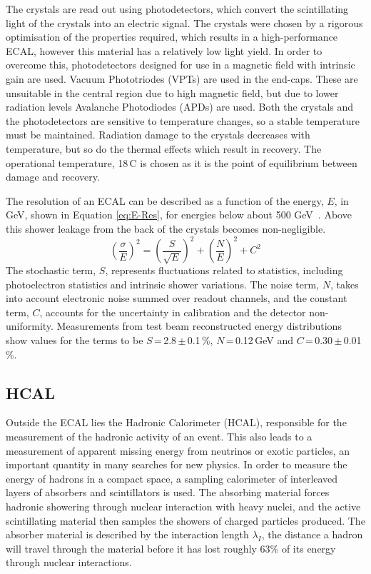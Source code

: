 The crystals are read out using photodetectors, which convert the scintillating light of the crystals into an electric signal. The crystals were chosen by a rigorous optimisation of the properties required, which results in a high-performance ECAL, however this material has a relatively low light yield. In order to overcome this, photodetectors designed for use in a magnetic field with intrinsic gain are used. Vacuum Phototriodes  (VPTs) are used in the end-caps. These are unsuitable in the central region due to high magnetic field, but due to lower radiation levels Avalanche Photodiodes (APDs) are used. Both the crystals and the photodetectors are sensitive to temperature changes, so a stable temperature must be maintained. Radiation damage to the crystals decreases with temperature, but so do the thermal effects which result in recovery. The operational temperature, 18\,\textdegree C is chosen as it is the point of equilibrium between damage and recovery.


The resolution of an ECAL can be described as a function of the energy, $E$, in GeV, shown in Equation \ref{eq:E-Res}, for energies below about 500 GeV~\cite{PDG}. Above this shower leakage from the back of the crystals becomes non-negligible. 
\begin{equation}
\left(\frac{\sigma}{E}\right)^2 = \left(\frac{S}{\sqrt{E}}\right)^2 + \left(\frac{N}{E}\right)^2 + C^2
\label{eq:E-Res}
\end{equation}
The stochastic term, $S$, represents fluctuations related to statistics, including photoelectron statistics and intrinsic shower variations. The noise term, $N$, takes into account electronic noise summed over readout channels, and the constant term, $C$, accounts for the uncertainty in calibration and the detector non-uniformity. Measurements from test beam reconstructed energy distributions show values for the terms to be $S$\,=\,2.8\,$\pm$\,0.1\,\%, $N$\,=\,0.12\,GeV and $C$\,=\,0.30\,$\pm$\,0.01\,\%. 


\subsection{HCAL}

Outside the ECAL lies the Hadronic Calorimeter (HCAL),  responsible for the measurement of the hadronic activity of an event. This also leads to a measurement of apparent missing energy from neutrinos or exotic particles, an important quantity in many searches for new physics. In order to measure the energy of hadrons in a compact space, a sampling calorimeter of interleaved layers of absorbers and scintillators is used. The absorbing material forces hadronic showering through nuclear interaction with heavy nuclei, and the active scintillating material then samples the showers of charged particles produced. The absorber material is described by the interaction length $\lambda_{I}$, the distance a hadron will travel through the material before it has lost roughly 63\% of its energy through nuclear interactions.

